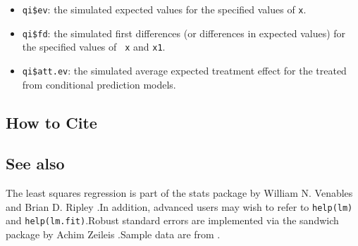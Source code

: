 \begin{itemize}
   \begin{itemize}
   \item {\tt qi\$ev}: the simulated expected values for the specified
     values of {\tt x}.
   \item {\tt qi\$fd}:  the simulated first differences (or
     differences in expected values) for the specified values of {\tt
       x} and {\tt x1}. 
   \item {\tt qi\$att.ev}: the simulated average expected treatment
     effect for the treated from conditional prediction models.  
   \end{itemize}
\end{itemize}

\subsection* {How to Cite} 



\subsection* {See also}
The least squares regression is part of the stats package by William N.
Venables and Brian D. Ripley \citep{VenRip02}.In addition, advanced users may wish to refer to \texttt{help(lm)} and \texttt{help(lm.fit)}.Robust standard errors are implemented via the sandwich package by Achim Zeileis \citep{Zeileis04}.Sample data are from \cite{KinTomWit00}.



 

